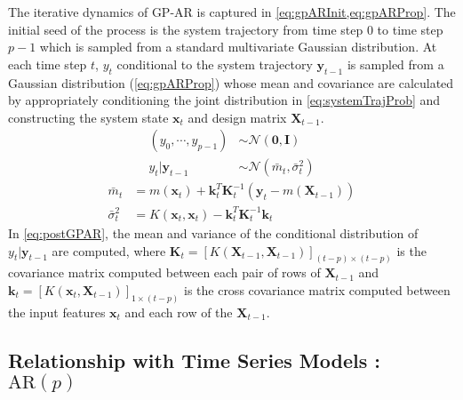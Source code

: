 The iterative dynamics of GP-AR is captured in \cref{eq:gpARInit,eq:gpARProp}. The initial seed of the process is the 
system trajectory from time step $0$ to time step $p-1$ which is sampled from a standard multivariate Gaussian distribution. At each time step $t$, $y_t$ conditional to the system trajectory $\mathbf{y}_{t-1}$ is sampled 
from a Gaussian distribution (\cref{eq:gpARProp}) whose mean and covariance are calculated by appropriately 
conditioning the joint distribution in \cref{eq:systemTrajProb} and constructing the system state 
$\mathbf{x}_t$ and design matrix $\mathbf{X}_{t-1}$.     
%
\begin{align}
    (y_0, \cdots, y_{p-1}) &\sim \mathcal{N}(\mathbf{0}, \mathbf{I}) \label{eq:gpARInit}\\
    y_t \rvert \mathbf{y}_{t-1} &\sim \mathcal{N}(\bar{m}_t, \bar{\sigma}_{t}^2) \label{eq:gpARProp}
\end{align}
%
\begin{equation}\label{eq:postGPAR}
    \begin{aligned}
        \bar{m}_t &= m(\mathbf{x}_t) + 
        \mathbf{k}_{t}^{T}\mathbf{K}_{t}^{-1}\left( \mathbf{y}_t - m(\mathbf{X}_{t-1}) \right) \\
        \bar{\sigma}^{2}_{t} &= K(\mathbf{x}_t, \mathbf{x}_t) - 
        \mathbf{k}_{t}^{T} \mathbf{K}_{t}^{-1} \mathbf{k}_{t}
    \end{aligned}
\end{equation}
%
In \cref{eq:postGPAR}, the mean and variance of the conditional distribution of $y_t \rvert \mathbf{y}_{t-1}$ are 
computed, where $\mathbf{K}_{t} = [K(\mathbf{X}_{t-1}, \mathbf{X}_{t-1})]_{(t-p) \times (t-p)}$ is the 
covariance matrix computed between each pair of rows of $\mathbf{X}_{t-1}$ and 
$\mathbf{k}_{t} = [K(\mathbf{x}_t, \mathbf{X}_{t-1})]_{1 \times (t-p)}$ is the cross covariance matrix computed 
between the input features $\mathbf{x}_t$ and each row of the $\mathbf{X}_{t-1}$.

\subsection*{Relationship with Time Series Models : $\mathrm{AR}(p)$}

